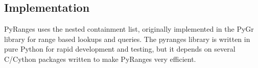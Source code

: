 \documentclass[10pt,letterpaper]{article}
\begin{document}


\subsection*{Implementation}

PyRanges uses the nested containment list, originally implemented in the PyGr
library \cite{doi:10.1093/bioinformatics/btl647} for range based lookups and
queries. The pyranges library is written in pure Python for rapid development
and testing, but it depends on several C/Cython packages written to make
PyRanges very efficient.
\end{document}
